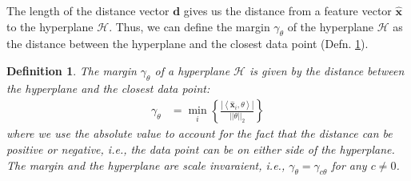 \documentclass{article}[11pt]
\newtheorem{defn}{Definition}
\newcommand{\norm}[1]{\left|\left|#1\right|\right|}
\begin{document}
The length of the distance vector $\mathbf{d}$ gives us the distance from a feature vector $\hat{\mathbf{x}}$ to the hyperplane $\mathcal{H}$.
Thus, we can define the margin $\gamma_{\theta}$ of the hyperplane $\mathcal{H}$ as the distance between the hyperplane and the closest data point (Defn. \ref{defn:margin}).
\begin{defn}\label{defn:margin}
    The margin $\gamma_{\theta}$ of a hyperplane $\mathcal{H}$ is given by the distance between the hyperplane and the closest data point:
    \begin{align*}
        \gamma_{\theta} & = \min_{i}\left\{\frac{|\left<\hat{\mathbf{x}}_{i},\theta\right>|}{\norm{\theta}_{2}}\right\}
    \end{align*}
where we use the absolute value to account for the fact that the distance can be positive or negative, i.e., the data point can be on either side of the hyperplane.
The margin and the hyperplane are scale invaraient, i.e., $\gamma_{\theta} = \gamma_{c\theta}$ for any $c \neq 0$.
\end{defn}
\end{document}
